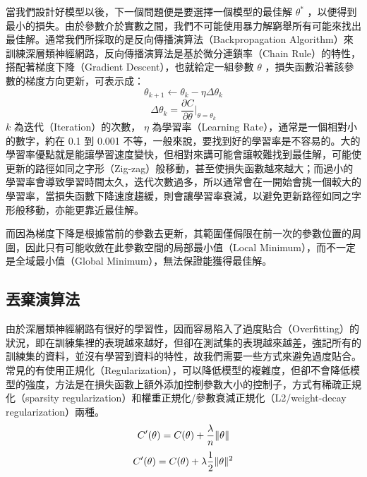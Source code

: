 當我們設計好模型以後，下一個問題便是要選擇一個模型的最佳解 $\theta^{\ast}$ ，以便得到最小的損失。由於參數介於實數之間，我們不可能使用暴力解窮舉所有可能來找出最佳解。通常我們所採取的是反向傳播演算法（Backpropagation Algorithm）來訓練深層類神經網路，反向傳播演算法是基於微分連鎖率（Chain Rule）的特性，搭配著梯度下降（Gradient Descent），也就給定一組參數 $\theta$ ，損失函數沿著該參數的梯度方向更新，可表示成：
\begin{equation}
    \theta_{k+1} \leftarrow \theta_k - \eta\Delta\theta_k
\end{equation}
\begin{equation}
    \Delta\theta_k = \frac{\partial C}{\partial\theta}\biggr|_{\theta = \theta_k}
\end{equation}
$k$ 為迭代（Iteration）的次數， $\eta$ 為學習率（Learning Rate），通常是一個相對小的數字，約在 0.1 到 0.001 不等，一般來說，要找到好的學習率是不容易的。大的學習率優點就是能讓學習速度變快，但相對來講可能會讓較難找到最佳解，可能使更新的路徑如同之字形（Zig-zag）般移動，甚至使損失函數越來越大；而過小的學習率會導致學習時間太久，迭代次數過多，所以通常會在一開始會挑一個較大的學習率，當損失函數下降速度趨緩，則會讓學習率衰減，以避免更新路徑如同之字形般移動，亦能更靠近最佳解。

而因為梯度下降是根據當前的參數去更新，其範圍僅侷限在前一次的參數位置的周圍，因此只有可能收斂在此參數空間的局部最小值（Local Minimum），而不一定是全域最小值（Global Minimum），無法保證能獲得最佳解。

\subsection{丟棄演算法}
由於深層類神經網路有很好的學習性，因而容易陷入了過度貼合（Overfitting）的狀況，即在訓練集裡的表現越來越好，但卻在測試集的表現越來越差，強記所有的訓練集的資料，並沒有學習到資料的特性，故我們需要一些方式來避免過度貼合。常見的有使用正規化（Regularization），可以降低模型的複雜度，但卻不會降低模型的強度，方法是在損失函數上額外添加控制參數大小的控制子，方式有稀疏正規化（sparsity regularization）和權重正規化/參數衰減正規化（L2/weight-decay regularization）兩種。
\begin{equation}
    C'(\theta) = C(\theta) + \frac{\lambda}{n}\Arrowvert\theta\Arrowvert
\end{equation}
\begin{equation}
    C'(\theta) = C(\theta) + \lambda\frac{1}{2}\Arrowvert\theta\Arrowvert^2
\end{equation}

